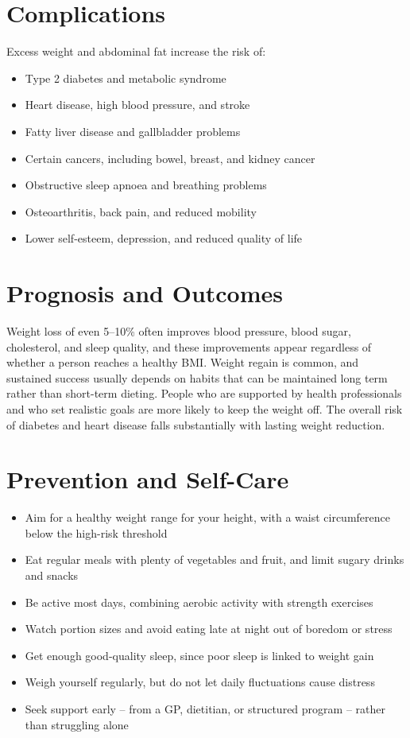 \section*{Complications}
Excess weight and abdominal fat increase the risk of:

\begin{itemize}
    \item Type 2 diabetes and metabolic syndrome
    \item Heart disease, high blood pressure, and stroke
    \item Fatty liver disease and gallbladder problems
    \item Certain cancers, including bowel, breast, and kidney cancer
    \item Obstructive sleep apnoea and breathing problems
    \item Osteoarthritis, back pain, and reduced mobility
    \item Lower self-esteem, depression, and reduced quality of life
\end{itemize}

\section*{Prognosis and Outcomes}
Weight loss of even 5--10\% often improves blood pressure, blood sugar, cholesterol, and sleep quality, and these improvements appear regardless of whether a person reaches a healthy BMI. Weight regain is common, and sustained success usually depends on habits that can be maintained long term rather than short-term dieting. People who are supported by health professionals and who set realistic goals are more likely to keep the weight off. The overall risk of diabetes and heart disease falls substantially with lasting weight reduction.

\section*{Prevention and Self-Care}
\begin{itemize}
    \item Aim for a healthy weight range for your height, with a waist circumference below the high-risk threshold
    \item Eat regular meals with plenty of vegetables and fruit, and limit sugary drinks and snacks
    \item Be active most days, combining aerobic activity with strength exercises
    \item Watch portion sizes and avoid eating late at night out of boredom or stress
    \item Get enough good-quality sleep, since poor sleep is linked to weight gain
    \item Weigh yourself regularly, but do not let daily fluctuations cause distress
    \item Seek support early -- from a GP, dietitian, or structured program -- rather than struggling alone
\end{itemize}

